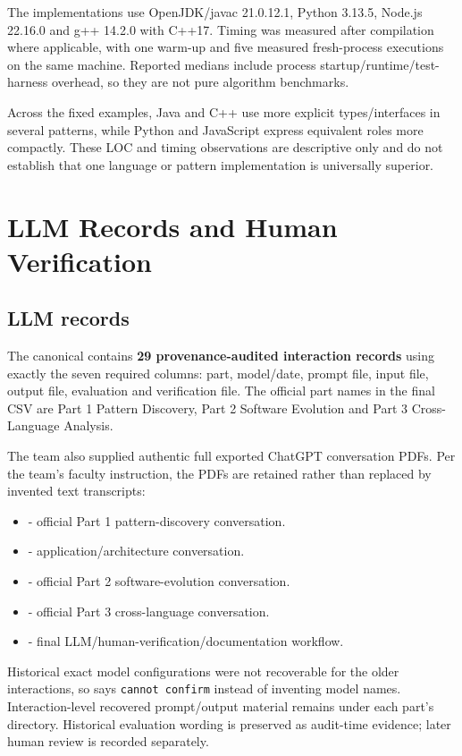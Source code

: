 \documentclass[11pt,a4paper]{article}
\renewcommand{\_}{\textunderscore\allowbreak}
\begin{document}
The implementations use OpenJDK/javac 21.0.12.1, Python 3.13.5, Node.js 22.16.0 and g++ 14.2.0 with C++17. Timing was measured after compilation where applicable, with one warm-up and five measured fresh-process executions on the same machine. Reported medians include process startup/runtime/test-harness overhead, so they are not pure algorithm benchmarks.

Across the fixed examples, Java and C++ use more explicit types/interfaces in several patterns, while Python and JavaScript express equivalent roles more compactly. These LOC and timing observations are descriptive only and do not establish that one language or pattern implementation is universally superior.

\section{LLM Records and Human Verification}
\subsection{LLM records}
The canonical  contains \textbf{29 provenance-audited interaction records} using exactly the seven required columns: part, model/date, prompt file, input file, output file, evaluation and verification file. The official part names in the final CSV are Part 1 Pattern Discovery, Part 2 Software Evolution and Part 3 Cross-Language Analysis.

The team also supplied authentic full exported ChatGPT conversation PDFs. Per the team's faculty instruction, the PDFs are retained rather than replaced by invented text transcripts:
\begin{itemize}
\item {} - official Part 1 pattern-discovery conversation.
\item {} - application/architecture conversation.
\item {} - official Part 2 software-evolution conversation.
\item {} - official Part 3 cross-language conversation.
\item {} - final LLM/human-verification/documentation workflow.
\end{itemize}

Historical exact model configurations were not recoverable for the older interactions, so  says \texttt{cannot confirm} instead of inventing model names. Interaction-level recovered prompt/output material remains under each part's  directory. Historical evaluation wording is preserved as audit-time evidence; later human review is recorded separately.
\end{document}
